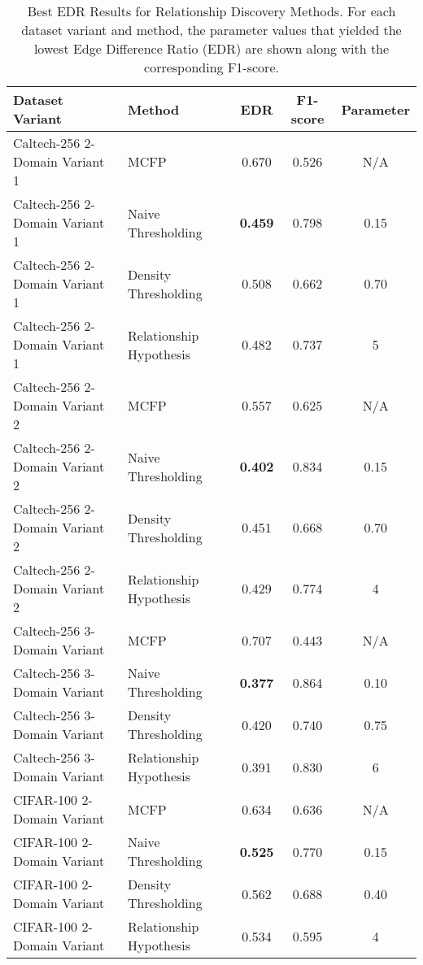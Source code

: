 \begin{table}[ht]
\centering
\caption{Best EDR Results for Relationship Discovery Methods. For each dataset variant and method, the parameter values that yielded the lowest Edge Difference Ratio (EDR) are shown along with the corresponding F1-score.}
\label{tab:relationship_methods_best_edr}
\begin{tabular}{llccc}
\toprule
Dataset Variant & Method & EDR & F1-score & Parameter \\
\midrule
Caltech-256 2-Domain Variant 1 & MCFP & 0.670 & 0.526 & N/A \\
Caltech-256 2-Domain Variant 1 & Naive Thresholding & \textbf{0.459} & 0.798 & 0.15 \\
Caltech-256 2-Domain Variant 1 & Density Thresholding & 0.508 & 0.662 & 0.70 \\
Caltech-256 2-Domain Variant 1 & Relationship Hypothesis & 0.482 & 0.737 & 5 \\
\hline
Caltech-256 2-Domain Variant 2 & MCFP & 0.557 & 0.625 & N/A \\
Caltech-256 2-Domain Variant 2 & Naive Thresholding & \textbf{0.402} & 0.834 & 0.15 \\
Caltech-256 2-Domain Variant 2 & Density Thresholding & 0.451 & 0.668 & 0.70 \\
Caltech-256 2-Domain Variant 2 & Relationship Hypothesis & 0.429 & 0.774 & 4 \\
\hline
Caltech-256 3-Domain Variant & MCFP & 0.707 & 0.443 & N/A \\
Caltech-256 3-Domain Variant & Naive Thresholding & \textbf{0.377} & 0.864 & 0.10 \\
Caltech-256 3-Domain Variant & Density Thresholding & 0.420 & 0.740 & 0.75 \\
Caltech-256 3-Domain Variant & Relationship Hypothesis & 0.391 & 0.830 & 6 \\
\hline
CIFAR-100 2-Domain Variant & MCFP & 0.634 & 0.636 & N/A \\
CIFAR-100 2-Domain Variant & Naive Thresholding & \textbf{0.525} & 0.770 & 0.15 \\
CIFAR-100 2-Domain Variant & Density Thresholding & 0.562 & 0.688 & 0.40 \\
CIFAR-100 2-Domain Variant & Relationship Hypothesis & 0.534 & 0.595 & 4 \\
\bottomrule
\end{tabular}
\end{table}
